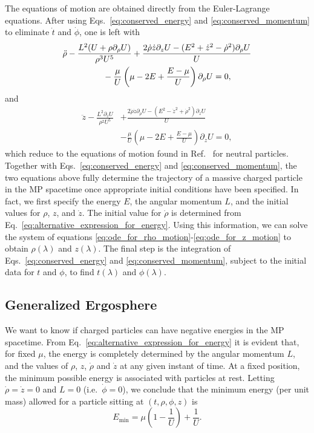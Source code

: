 The equations of motion are obtained directly from the Euler-Lagrange equations. After using Eqs.~\eqref{eq:conserved_energy} and \eqref{eq:conserved_momentum} to eliminate $\dot{t}$ and $\dot{\phi}$, one is left with
\begin{align}
    \ddot{\rho} & -\frac{L^2(U +\rho \partial_{\rho}U)}{\rho^3 U^5} + \frac{2\dot{\rho}\dot{z}\partial_{z}U - (E^2 + \dot{z}^2 - \dot{\rho}^2)\partial_{\rho}U}{U} \nonumber \\ & \hspace{1.5cm} - \frac{\mu}{U}\left(\mu-2 E+\frac{E-\mu}{U}\right)\partial_{\rho}U = 0,
    \label{eq:ode_for_rho_motion}
\end{align}
%
and
\begin{align}
    \ddot{z} - \frac{L^2\partial_{z}U}{\rho^2 U^5} & + \frac{2\dot{\rho}\dot{z}\partial_{\rho}U - (E^2 - \dot{z}^2 + \dot{\rho}^2)\partial_{z}U}{U} \nonumber \\ &-  \frac{\mu}{U}\left(\mu-2 E+\frac{ E-\mu}{U}\right)\partial_{z}U = 0,
    \label{eq:ode_for_z_motion}
\end{align}
which reduce to the equations of motion found in Ref.~\cite{ASSUMPCAO2018} for neutral particles. Together with Eqs.~\eqref{eq:conserved_energy} and \eqref{eq:conserved_momentum}, the two equations above fully determine the trajectory of a massive charged particle in the MP spacetime once appropriate initial conditions have been specified. In fact, we first specify the energy $E$, the angular momentum $L$, and the initial values for $\rho$, $z$, and $\dot z$. The initial value for $\dot{\rho}$ is determined from Eq.~\eqref{eq:alternative_expression_for_energy}. Using this information, we can solve the system of equations \eqref{eq:ode_for_rho_motion}-\eqref{eq:ode_for_z_motion} to obtain $\rho(\lambda)$ and $z(\lambda)$. The final step is the integration of Eqs.~\eqref{eq:conserved_energy} and \eqref{eq:conserved_momentum}, subject to the initial data for $t$ and $\phi$, to find $t(\lambda)$ and $\phi(\lambda)$.




\subsection{Generalized Ergosphere} \label{Sec:gen_ergo}

We want to know if charged particles can have negative energies in the MP spacetime. From Eq.~\eqref{eq:alternative_expression_for_energy} it is evident that, for fixed $\mu$, the energy is completely determined by the angular momentum $L$, and the values of $\rho$, $z$, $\dot{\rho}$ and $\dot{z}$  at any given instant of time. At a fixed position, the minimum possible energy is associated with particles at rest. Letting $\dot{\rho}=\dot{z}=0$ and $L=0$ (i.e.~$\dot{\phi}=0$), we conclude that the minimum energy (per unit mass) allowed for a particle sitting at $(t,\rho,\phi,z)$ is
\begin{equation} \label{eq:minimum_energy}
    E_{\mathrm{min}} = \mu\left(1-\frac{1}{U}\right) + \frac{1}{U}.
\end{equation}

